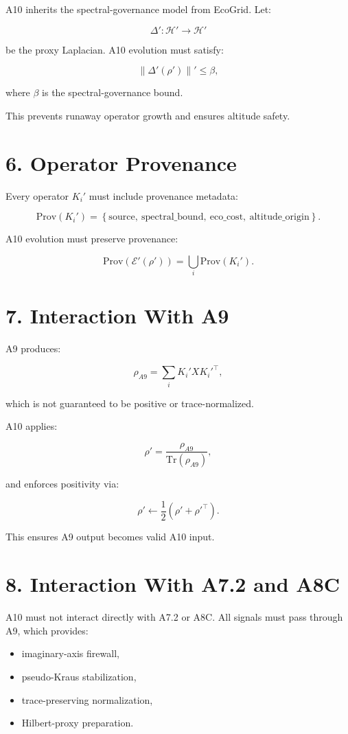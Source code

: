 \documentclass[11pt]{article}
\begin{document}
A10 inherits the spectral-governance model from EcoGrid. Let:

\[
\Delta' : \mathcal{H}' \to \mathcal{H}'
\]

be the proxy Laplacian. A10 evolution must satisfy:

\[
\|\Delta'(\rho')\|' \le \beta,
\]

where \(\beta\) is the spectral-governance bound.

This prevents runaway operator growth and ensures altitude safety.

\section*{6. Operator Provenance}

Every operator \(K_i'\) must include provenance metadata:

\[
\mathrm{Prov}(K_i') = 
\left\{
\mathrm{source},\ 
\mathrm{spectral\_bound},\ 
\mathrm{eco\_cost},\ 
\mathrm{altitude\_origin}
\right\}.
\]

A10 evolution must preserve provenance:

\[
\mathrm{Prov}(\mathcal{E}'(\rho')) = 
\bigcup_i \mathrm{Prov}(K_i').
\]

\section*{7. Interaction With A9}

A9 produces:

\[
\rho_{A9} = \sum_i K_i' X K_i'^\top,
\]

which is not guaranteed to be positive or trace-normalized.

A10 applies:

\[
\rho' = \frac{\rho_{A9}}{\mathrm{Tr}(\rho_{A9})},
\]

and enforces positivity via:

\[
\rho' \leftarrow \frac{1}{2}(\rho' + \rho'^\top).
\]

This ensures A9 output becomes valid A10 input.

\section*{8. Interaction With A7.2 and A8C}

A10 must not interact directly with A7.2 or A8C. All signals must pass
through A9, which provides:

\begin{itemize}
\item imaginary-axis firewall,
\item pseudo-Kraus stabilization,
\item trace-preserving normalization,
\item Hilbert-proxy preparation.
\end{itemize}
\end{document}
